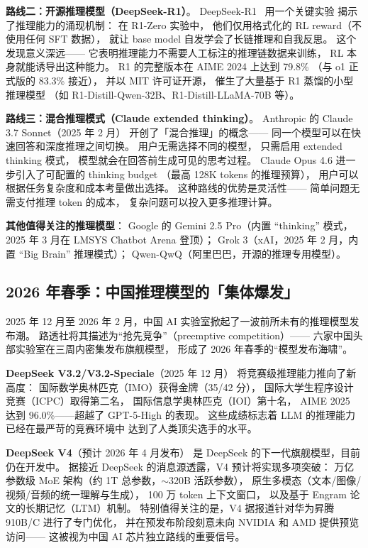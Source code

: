 \textbf{路线二：开源推理模型（DeepSeek-R1）}。
DeepSeek-R1~\cite{deepseekr1} 用一个关键实验
揭示了推理能力的涌现机制：
在 R1-Zero 实验中，
他们仅用格式化的 RL reward（不使用任何 SFT 数据），
就让 base model 自发学会了长链推理和自我反思。
这个发现意义深远——
它表明推理能力不需要人工标注的推理链数据来训练，
RL 本身就能诱导出这种能力。
R1 的完整版本在 AIME 2024 上达到 79.8\%
（与 o1 正式版的 83.3\% 接近），
并以 MIT 许可证开源，
催生了大量基于 R1 蒸馏的小型推理模型
（如 R1-Distill-Qwen-32B、R1-Distill-LLaMA-70B 等）。

\textbf{路线三：混合推理模式（Claude extended thinking）}。
Anthropic 的 Claude 3.7 Sonnet（2025 年 2 月）
开创了「混合推理」的概念——
同一个模型可以在快速回答和深度推理之间切换。
用户无需选择不同的模型，
只需启用 extended thinking 模式，
模型就会在回答前生成可见的思考过程。
Claude Opus 4.6 进一步引入了可配置的 thinking budget
（最高 128K tokens 的推理预算），
用户可以根据任务复杂度和成本考量做出选择。
这种路线的优势是灵活性——
简单问题无需支付推理 token 的成本，
复杂问题可以投入更多推理计算。

\textbf{其他值得关注的推理模型}：
Google 的 Gemini 2.5 Pro（内置 ``thinking'' 模式，
2025 年 3 月在 LMSYS Chatbot Arena 登顶）；
Grok 3（xAI，2025 年 2 月，内置 ``Big Brain'' 推理模式）；
Qwen-QwQ（阿里巴巴，开源的推理专用模型）。

\subsection{2026 年春季：中国推理模型的「集体爆发」}

2025 年 12 月至 2026 年 2 月，中国 AI 实验室掀起了一波前所未有的推理模型发布潮。
路透社将其描述为``抢先竞争''（preemptive competition）——
六家中国头部实验室在三周内密集发布旗舰模型，
形成了 2026 年春季的``模型发布海啸''。

\textbf{DeepSeek V3.2/V3.2-Speciale}（2025 年 12 月）
将竞赛级推理能力推向了新高度：
国际数学奥林匹克（IMO）获得金牌（35/42 分），
国际大学生程序设计竞赛（ICPC）取得第二名，
国际信息学奥林匹克（IOI）第十名，
AIME 2025 达到 96.0\%——超越了 GPT-5-High 的表现。
这些成绩标志着 LLM 的推理能力已经在最严苛的竞赛环境中
达到了人类顶尖选手的水平。

\textbf{DeepSeek V4}（预计 2026 年 4 月发布）
是 DeepSeek 的下一代旗舰模型，目前仍在开发中。
据接近 DeepSeek 的消息源透露，V4 预计将实现多项突破：
万亿参数级 MoE 架构（约 1T 总参数，$\sim$320B 活跃参数），
原生多模态（文本/图像/视频/音频的统一理解与生成），
100 万 token 上下文窗口，
以及基于 Engram 论文的长期记忆（LTM）机制。
特别值得关注的是，V4 据报道针对华为昇腾 910B/C 进行了专门优化，
并在预发布阶段刻意未向 NVIDIA 和 AMD 提供预览访问——
这被视为中国 AI 芯片独立路线的重要信号。

